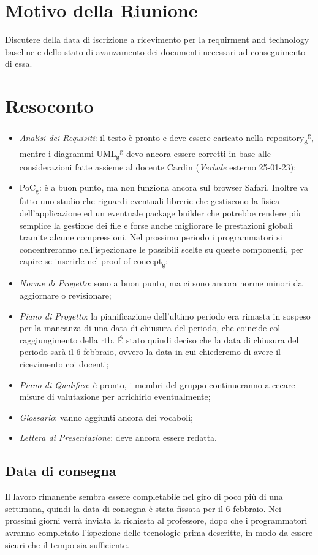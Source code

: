 \section{Motivo della Riunione}
Discutere della data di iscrizione a ricevimento per la requirment and technology baseline e dello stato di avanzamento dei documenti necessari ad conseguimento di essa.
\section{Resoconto}
\begin{itemize}
	\item \textit{Analisi dei Requisiti}: il testo è pronto e deve essere caricato nella repository\textsubscript{g}\textsuperscript{g}, mentre i diagrammi UML\textsubscript{g}\textsuperscript{g} devo ancora essere corretti in base alle considerazioni fatte assieme al docente Cardin (\textit{Verbale} esterno 25-01-23);
	
	\item PoC\textsubscript{g}: è a buon punto, ma non funziona ancora sul browser Safari. Inoltre va fatto uno studio che riguardi eventuali librerie che gestiscono la fisica dell'applicazione ed un eventuale package builder che potrebbe rendere più semplice la gestione dei file e forse anche migliorare le prestazioni globali tramite alcune compressioni. Nel prossimo periodo i programmatori si concentreranno nell'ispezionare le possibili scelte su queste componenti, per capire se inserirle nel proof of concept\textsubscript{g};
	
	\item \textit{Norme di Progetto}: sono a buon punto, ma ci sono ancora norme minori da aggiornare o revisionare;
	
	\item \textit{Piano di Progetto}: la pianificazione dell'ultimo periodo era rimasta in sospeso per la mancanza di una data di chiusura del periodo, che coincide col raggiungimento della rtb. É stato quindi deciso che la data di chiusura del periodo sarà il 6 febbraio, ovvero la data in cui chiederemo di avere il ricevimento coi docenti;
	
	\item \textit{Piano di Qualifica}: è pronto, i membri del gruppo continueranno a cecare misure di valutazione per arrichirlo eventualmente;
	
	\item \textit{Glossario}: vanno aggiunti ancora dei vocaboli;

	\item \textit{Lettera di Presentazione}: deve ancora essere redatta.
\end{itemize}

\subsection{Data di consegna}
Il lavoro rimanente sembra essere completabile nel giro di poco più di una settimana, quindi la data di consegna è stata fissata per il 6 febbraio. 
\newline Nei prossimi giorni verrà inviata la richiesta al professore, dopo che i programmatori avranno completato l'ispezione delle tecnologie prima descritte, in modo da essere sicuri che il tempo sia sufficiente.
